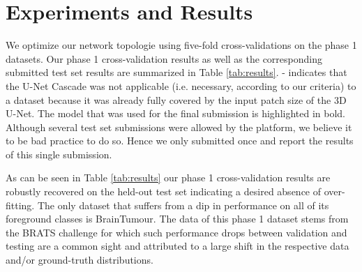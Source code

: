 \documentclass{templates/llncs}
\begin{document}
\section{Experiments and Results}
    We optimize our network topologie using five-fold cross-validations on the phase 1 datasets. Our phase 1 cross-validation results as well as the corresponding submitted test set results are summarized in Table \ref{tab:results}. - indicates that the U-Net Cascade was not applicable (i.e. necessary, according to our criteria) to a dataset because it was already fully covered by the input patch size of the 3D U-Net. The model that was used for the final submission is highlighted in bold. Although several test set submissions were allowed by the platform, we believe it to be bad practice to do so. Hence we only submitted once and report the results of this single submission. 
    
    As can be seen in Table \ref{tab:results} our phase 1 cross-validation results are robustly recovered on the held-out test set indicating a desired absence of over-fitting. The only dataset that suffers from a dip in performance on all of its foreground classes is BrainTumour. The data of this phase 1 dataset stems from the BRATS challenge \cite{menze2015multimodal} for which such performance drops between validation and testing are a common sight and attributed to a large shift in the respective data and/or ground-truth distributions.
\end{document}
